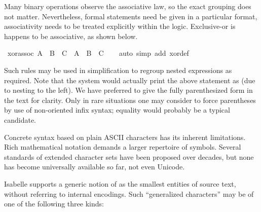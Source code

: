 \begin{isabellebody}
\begin{isamarkuptext}
  Many binary operations observe the associative law, so the exact
  grouping does not matter.  Nevertheless, formal statements need be
  given in a particular format, associativity needs to be treated
  explicitly within the logic.  Exclusive-or is happens to be
  associative, as shown below.%
\end{isamarkuptext}%
\isamarkuptrue%
\ xor{\isacharunderscore}assoc{\isacharcolon}\ {\isachardoublequote}{\isacharparenleft}A\ {\isacharbrackleft}{\isacharplus}{\isacharbrackright}\ B{\isacharparenright}\ {\isacharbrackleft}{\isacharplus}{\isacharbrackright}\ C\ {\isacharequal}\ A\ {\isacharbrackleft}{\isacharplus}{\isacharbrackright}\ {\isacharparenleft}B\ {\isacharbrackleft}{\isacharplus}{\isacharbrackright}\ C{\isacharparenright}{\isachardoublequote}\isanewline
\ \ \isamarkupfalse%
\ {\isacharparenleft}auto\ simp\ add{\isacharcolon}\ xor{\isacharunderscore}def{\isacharparenright}\isamarkupfalse%
%
\begin{isamarkuptext}%
Such rules may be used in simplification to regroup nested
  expressions as required.  Note that the system would actually print
  the above statement as 
  (due to nesting to the left).  We have preferred to give the fully
  parenthesized form in the text for clarity.  Only in rare situations
  one may consider to force parentheses by use of non-oriented infix
  syntax; equality would probably be a typical candidate.%
\end{isamarkuptext}%
\isamarkuptrue%
%
\isamarkuptrue%
%
\begin{isamarkuptext}%
Concrete syntax based on plain ASCII characters has its inherent
  limitations.  Rich mathematical notation demands a larger repertoire
  of symbols.  Several standards of extended character sets have been
  proposed over decades, but none has become universally available so
  far, not even Unicode.

  Isabelle supports a generic notion of  as the
  smallest entities of source text, without referring to internal
  encodings.  Such ``generalized characters'' may be of one of the
  following three kinds:

  \begin{enumerate}


\end{enumerate}
\end{isamarkuptext}
\end{isabellebody}
